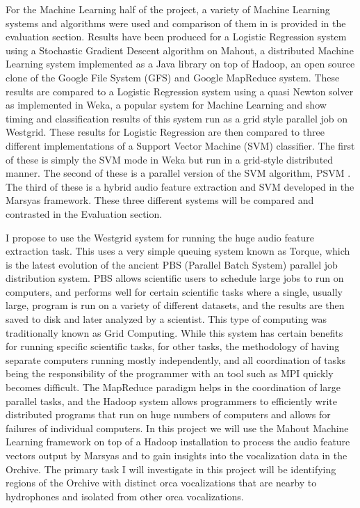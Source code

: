 \documentclass[12pt,oneside]{book}
\begin{document}
For the Machine Learning half of the project, a variety of Machine
Learning systems and algorithms were used and comparison of them in is
provided in the evaluation section.  Results have been produced for a
Logistic Regression system using a Stochastic Gradient Descent
algorithm on Mahout, a distributed Machine Learning system implemented
as a Java library on top of Hadoop, an open source clone of the Google
File System (GFS) and Google MapReduce system.  These results are
compared to a Logistic Regression system using a quasi Newton solver
as implemented in Weka, a popular system for Machine Learning and show
timing and classification results of this system run as a grid style
parallel job on Westgrid.  These results for Logistic Regression are
then compared to three different implementations of a Support Vector
Machine (SVM) classifier.  The first of these is simply the SVM mode
in Weka but run in a grid-style distributed manner.  The second of
these is a parallel version of the SVM algorithm, PSVM
\cite{chang07psvm}.  The third of these is a hybrid audio feature
extraction and SVM developed in the Marsyas framework.  These three
different systems will be compared and contrasted in the Evaluation
section.

I propose to use the Westgrid system for running the huge audio
feature extraction task. This uses a very simple queuing system known
as Torque, which is the latest evolution of the ancient PBS (Parallel
Batch System) parallel job distribution system. PBS allows scientific
users to schedule large jobs to run on computers, and performs well
for certain scientific tasks where a single, usually large, program is
run on a variety of different datasets, and the results are then saved
to disk and later analyzed by a scientist. This type of computing was
traditionally known as Grid Computing.  While this system has certain
benefits for running specific scientific tasks, for other tasks, the
methodology of having separate computers running mostly independently,
and all coordination of tasks being the responsibility of the
programmer with an tool such as MPI quickly becomes difficult. The
MapReduce paradigm helps in the coordination of large parallel tasks,
and the Hadoop system allows programmers to efficiently write
distributed programs that run on huge numbers of computers and allows
for failures of individual computers. In this project we will use the
Mahout Machine Learning framework on top of a Hadoop installation to
process the audio feature vectors output by Marsyas and to gain
insights into the vocalization data in the Orchive. The primary task I
will investigate in this project will be identifying regions of the
Orchive with distinct orca vocalizations that are nearby to
hydrophones and isolated from other orca vocalizations.
\end{document}
